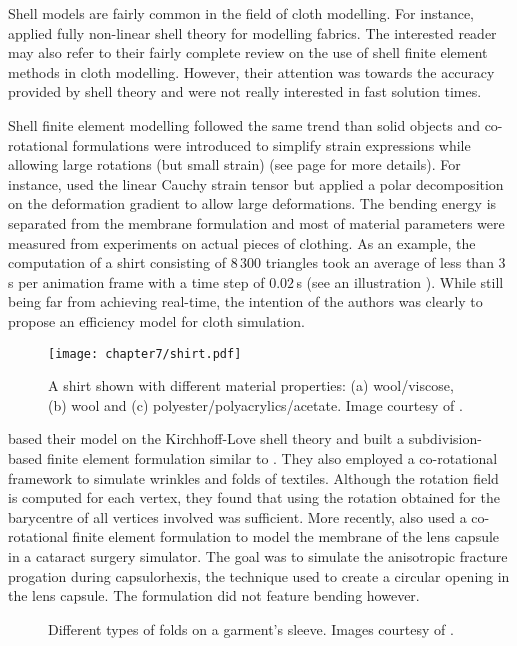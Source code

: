 Shell models are fairly common in the field of cloth modelling. For instance, \cite{Eischen96} applied fully non-linear shell theory for modelling fabrics. The interested reader may also refer to their fairly complete review on the use of shell finite element methods in cloth modelling. However, their attention was towards the accuracy provided by shell theory and were not really interested in fast solution times. 

Shell finite element modelling followed the same trend than solid objects and co-rotational formulations were introduced to simplify strain expressions while allowing large rotations (but small strain) (see page \pageref{chap4:corotationalMethods} for more details). For instance, \cite{Etzmuss03} used the linear Cauchy strain tensor but applied a polar decomposition on the deformation gradient to allow large deformations. The bending energy is separated from the membrane formulation and most of material parameters were measured from experiments on actual pieces of clothing. As an example, the computation of a shirt consisting of $ 8\,300 $ triangles took an average of less than $ 3\,$s per animation frame with a time step of $ 0.02\,$s (see an illustration ). While still being far from achieving real-time, the intention of the authors was clearly to propose an efficiency model for cloth simulation. 
%
\begin{figure}[ht]
\begin{center}
\texttt{[image: chapter7/shirt.pdf]}
\caption[A shirt shown with different material properties]{A shirt shown with different material properties: (a) wool/viscose, (b) wool and (c) polyester/polyacrylics/acetate. Image courtesy of \cite{Etzmuss03}.}
\label{chap7:fig-shirt}
\end{center}
\end{figure}

\cite{Thomaszewski06} based their model on the Kirchhoff-Love shell theory and built a subdivision-based finite element formulation similar to \cite{Cirak00}.  They also employed a co-rotational framework to simulate wrinkles and folds of textiles. Although the rotation field is computed for each vertex, they found that using the rotation obtained for the barycentre of all vertices involved was sufficient. More recently, \cite{Allard09} also used a co-rotational finite element formulation to model the membrane of the lens capsule in a cataract surgery simulator. The goal was to simulate the anisotropic fracture progation during capsulorhexis, the technique used to create a circular opening in the lens capsule. The formulation did not feature bending however. 
%
\begin{figure}[ht]
\centering 
{}
\hfill 
{}
\hfill 
{}
\caption[Different types of folds on a garment's sleeve ]{Different types of folds on a garment's sleeve. Images courtesy of \cite{Thomaszewski06}.}
\label{chap7:fig-sheet}
\end{figure}

